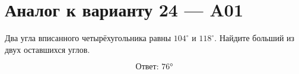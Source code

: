 


\section*{Аналог к варианту 24 — A01}
Два угла вписанного четырёхугольника равны \(104^\circ\) и \(118^\circ\). Найдите больший из двух оставшихся углов.
\begin{center}\figCyclicTwoAngles\end{center}
\[\boxed{\text{Ответ: }76°}\]


